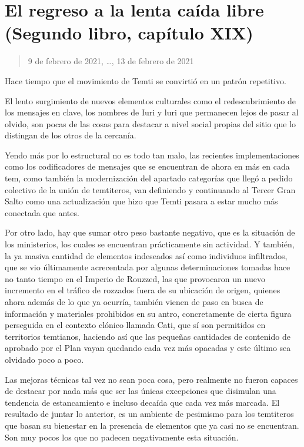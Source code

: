 \documentclass[
]{book}
\begin{document}
\hypertarget{el-regreso-a-la-lenta-cauxedda-libre-segundo-libro-capuxedtulo-xix}{%
\section{El regreso a la lenta caída libre (Segundo libro, capítulo XIX)}\label{el-regreso-a-la-lenta-cauxedda-libre-segundo-libro-capuxedtulo-xix}}

\begin{quote}
9 de febrero de 2021, \ldots, 13 de febrero de 2021
\end{quote}

Hace tiempo que el movimiento de Temti se convirtió en un patrón repetitivo.

El lento surgimiento de nuevos elementos culturales como el redescubrimiento de los mensajes en clave, los nombres de Iuri y luri que permanecen lejos de pasar al olvido, son pocas de las cosas para destacar a nivel social propias del sitio que lo distingan de los otros de la cercanía.

Yendo más por lo estructural no es todo tan malo, las recientes implementaciones como los codificadores de mensajes que se encuentran de ahora en más en cada tem, como también la modernización del apartado categorías que llegó a pedido colectivo de la unión de temtiteros, van definiendo y continuando al Tercer Gran Salto como una actualización que hizo que Temti pasara a estar mucho más conectada que antes.

Por otro lado, hay que sumar otro peso bastante negativo, que es la situación de los ministerios, los cuales se encuentran prácticamente sin actividad. Y también, la ya masiva cantidad de elementos indeseados así como individuos infiltrados, que se vio últimamente acrecentada por algunas determinaciones tomadas hace no tanto tiempo en el Imperio de Rouzzed, las que provocaron un nuevo incremento en el tráfico de rozzados fuera de su ubicación de origen, quienes ahora además de lo que ya ocurría, también vienen de paso en busca de información y materiales prohibidos en su antro, concretamente de cierta figura perseguida en el contexto clónico llamada Cati, que sí son permitidos en territorios temtianos, haciendo así que las pequeñas cantidades de contenido de aprobado por el Plan vayan quedando cada vez más opacadas y este último sea olvidado poco a poco.

Las mejoras técnicas tal vez no sean poca cosa, pero realmente no fueron capaces de destacar por nada más que ser las únicas excepciones que disimulan una tendencia de estancamiento e incluso decaída que cada vez más marcada. El resultado de juntar lo anterior, es un ambiente de pesimismo para los temtiteros que basan su bienestar en la presencia de elementos que ya casi no se encuentran. Son muy pocos los que no padecen negativamente esta situación.
\end{document}
